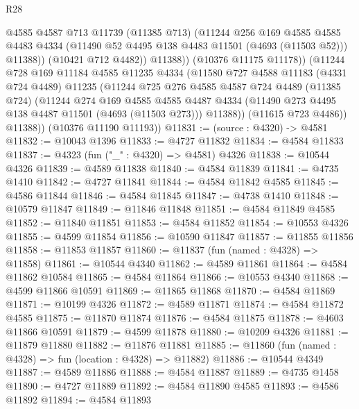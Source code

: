 \begin{lexlean}{R28}
\begin{coremodule}
                  @4585
                  @4587
                  @713
                  @11739
                  (@11385 @713)
                  (@11244
                    @256
                    @169
                    @4585
                    @4585
                    @4483
                    @4334
                    (@11490 @52 @4495 @138 @4483 @11501 (@4693 (@11503 @52)))
                    @11388))
                (@10421 @712 @4482))
              @11388))
          (@10376 @11175 @11178))
        (@11244
          @728
          @169
          @11184
          @4585
          @11235
          @4334
          (@11580
            @727
            @4588
            @11183
            (@4331 @724 @4489)
            @11235
            (@11244
              @725
              @276
              @4585
              @4587
              @724
              @4489
              (@11385 @724)
              (@11244
                @274
                @169
                @4585
                @4585
                @4487
                @4334
                (@11490 @273 @4495 @138 @4487 @11501 (@4693 (@11503 @273)))
                @11388))
            (@11615 @723 @4486))
          @11388))
      (@10376 @11190 @11193))
@11831 := (source : @4320) -> @4581
@11832 := @10043 @1396
@11833 := @4727 @11832
@11834 := @4584 @11833
@11837 := @4323 (fun ("_" : @4320) => @4581) @4326
@11838 := @10544 @4326
@11839 := @4589 @11838
@11840 := @4584 @11839
@11841 := @4735 @1410
@11842 := @4727 @11841
@11844 := @4584 @11842 @4585
@11845 := @4586 @11844
@11846 := @4584 @11845
@11847 := @4738 @1410
@11848 := @10579 @11847
@11849 := @11846 @11848
@11851 := @4584 @11849 @4585
@11852 := @11840 @11851
@11853 := @4584 @11852
@11854 := @10553 @4326
@11855 := @4599 @11854
@11856 := @10590 @11847
@11857 := @11855 @11856
@11858 := @11853 @11857
@11860 := @11837 (fun (named : @4328) => @11858)
@11861 := @10544 @4340
@11862 := @4589 @11861
@11864 := @4584 @11862 @10584
@11865 := @4584 @11864
@11866 := @10553 @4340
@11868 := @4599 @11866 @10591
@11869 := @11865 @11868
@11870 := @4584 @11869
@11871 := @10199 @4326
@11872 := @4589 @11871
@11874 := @4584 @11872 @4585
@11875 := @11870 @11874
@11876 := @4584 @11875
@11878 := @4603 @11866 @10591
@11879 := @4599 @11878
@11880 := @10209 @4326
@11881 := @11879 @11880
@11882 := @11876 @11881
@11885 := @11860 (fun (named : @4328) => fun (location : @4328) => @11882)
@11886 := @10544 @4349
@11887 := @4589 @11886
@11888 := @4584 @11887
@11889 := @4735 @1458
@11890 := @4727 @11889
@11892 := @4584 @11890 @4585
@11893 := @4586 @11892
@11894 := @4584 @11893

\end{coremodule}
\end{lexlean}
